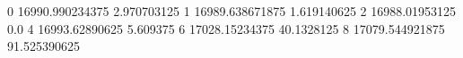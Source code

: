 0 16990.990234375 2.970703125
1 16989.638671875 1.619140625
2 16988.01953125 0.0
4 16993.62890625 5.609375
6 17028.15234375 40.1328125
8 17079.544921875 91.525390625
